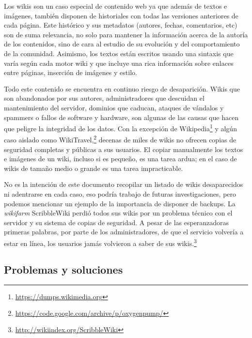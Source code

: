 \documentclass[14pt,twocolumn]{article}
\begin{document}
Los wikis son un caso especial de contenido web ya que además de textos e imágenes, también disponen de historiales con todas las versiones anteriores de cada página. Este histórico y sus metadatos (autores, fechas, comentarios, etc) son de suma relevancia, no solo para mantener la información acerca de la autoría de los contenidos, sino de cara al estudio de su evolución y del comportamiento de la comunidad. Asimismo, los textos están escritos usando una sintaxis que varía según cada motor wiki y que incluye una rica información sobre enlaces entre páginas, inserción de imágenes y estilo.

Todo este contenido se encuentra en continuo riesgo de desaparición. Wikis que son abandonados por sus autores, administradores que descuidan el mantenimiento del servidor, dominios que caducan, ataques de vándalos y spammers o fallos de software y hardware, son algunas de las causas que hacen que peligre la integridad de los datos. Con la excepción de Wikipedia\footnote{\href{https://dumps.wikimedia.org}{https://dumps.wikimedia.org}} y algún caso aislado como WikiTravel,\footnote{\href{https://code.google.com/archive/p/oxygenpump/}{https://code.google.com/archive/p/oxygenpump/}} decenas de miles de wikis no ofrecen copias de seguridad completas y públicas a sus usuarios. El copiar manualmente los textos e imágenes de un wiki, incluso si es pequeño, es una tarea ardua; en el caso de wikis de tamaño medio o grande es una tarea impracticable.

No es la intención de este documento recopilar un listado de wikis desaparecidos ni adentrarse en cada caso, eso podría trabajo de futuras investigaciones, pero podemos mencionar un ejemplo de la importancia de disponer de backups. La \textit{wikifarm} ScribbleWiki perdió todos sus wikis por un problema técnico con el servidor y su sistema de copias de seguridad. A pesar de las esperanzadoras primeras palabras, por parte de los administradores, de que el servicio volvería a estar en línea, los usuarios jamás volvieron a saber de sus wikis.\footnote{\href{http://wikiindex.org/ScribbleWiki}{http://wikiindex.org/ScribbleWiki}}

\subsection{Problemas y soluciones}
\end{document}
